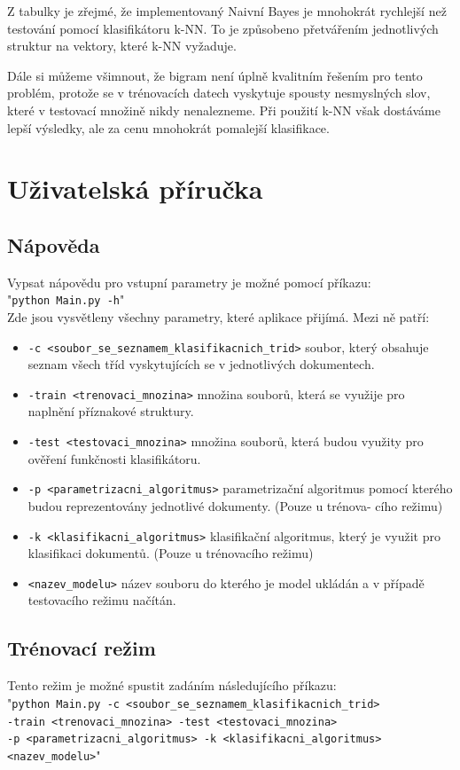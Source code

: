 \documentclass[ 12pt, a4paper]{article}
\begin{document}
Z tabulky je zřejmé, že implementovaný Naivní Bayes je mnohokrát rychlejší než testování pomocí klasifikátoru k-NN. To je způsobeno přetvářením jednotlivých struktur na vektory, které k-NN vyžaduje. 

Dále si můžeme všimnout, že bigram není úplně kvalitním řešením pro tento problém, protože se v trénovacích datech vyskytuje spousty nesmyslných slov, které v testovací množině nikdy nenalezneme. Při použití k-NN však dostáváme lepší výsledky, ale za cenu mnohokrát pomalejší klasifikace.



\newpage
\section{Uživatelská příručka}
\subsection{Nápověda}
Vypsat nápovědu pro vstupní parametry je možné pomocí příkazu:\\
"\texttt{python Main.py -h}"\\
Zde jsou vysvětleny všechny parametry, které aplikace přijímá. Mezi ně patří:
\begin{itemize}
	\item \texttt{-c <soubor\_se\_seznamem\_klasifikacnich\_trid>} soubor, který obsahuje seznam všech tříd vyskytujících se v jednotlivých dokumentech.
	\item \texttt{-train <trenovaci\_mnozina>} množina souborů, která se využije pro naplnění příznakové struktury.
	\item \texttt{-test <testovaci\_mnozina>} množina souborů, která budou využity pro ověření funkčnosti klasifikátoru.
	\item \texttt{-p <parametrizacni\_algoritmus>} parametrizační algoritmus pomocí kterého budou reprezentovány jednotlivé dokumenty. (Pouze u trénova- cího režimu) 
	\item \texttt{-k <klasifikacni\_algoritmus>} klasifikační algoritmus, který je využit pro klasifikaci dokumentů. (Pouze u trénovacího režimu)
	\item \texttt{<nazev\_modelu>} název souboru do kterého je model ukládán a v případě testovacího režimu načítán.
\end{itemize}

\subsection{Trénovací režim}
Tento režim je možné spustit zadáním následujícího příkazu:\\
"\texttt{python Main.py -c <soubor\_se\_seznamem\_klasifikacnich\_trid> 
	\\-train <trenovaci\_mnozina> -test <testovaci\_mnozina> 
	\\-p <parametrizacni\_algoritmus> -k <klasifikacni\_algoritmus> 
	\\<nazev\_modelu>}"\\
\end{document}
